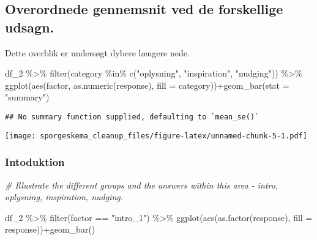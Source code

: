 \documentclass[
]{article}
\newenvironment{Shaded}{\begin{snugshade}}{\end{snugshade}}
\newcommand{\AttributeTok}[1]{\textcolor[rgb]{0.77,0.63,0.00}{#1}}
\newcommand{\CommentTok}[1]{\textcolor[rgb]{0.56,0.35,0.01}{\textit{#1}}}
\newcommand{\FunctionTok}[1]{\textcolor[rgb]{0.00,0.00,0.00}{#1}}
\newcommand{\NormalTok}[1]{#1}
\newcommand{\SpecialCharTok}[1]{\textcolor[rgb]{0.00,0.00,0.00}{#1}}
\newcommand{\StringTok}[1]{\textcolor[rgb]{0.31,0.60,0.02}{#1}}
\begin{document}
\hypertarget{overordnede-gennemsnit-ved-de-forskellige-udsagn.}{%
\subsection{Overordnede gennemsnit ved de forskellige
udsagn.}\label{overordnede-gennemsnit-ved-de-forskellige-udsagn.}}

Dette overblik er undersøgt dybere længere nede.

\begin{Shaded}
\begin{Highlighting}[]
\NormalTok{df\_2 }\SpecialCharTok{\%\textgreater{}\%} 
  \FunctionTok{filter}\NormalTok{(category }\SpecialCharTok{\%in\%} \FunctionTok{c}\NormalTok{(}\StringTok{"oplysning"}\NormalTok{, }\StringTok{"inspiration"}\NormalTok{, }\StringTok{"nudging"}\NormalTok{)) }\SpecialCharTok{\%\textgreater{}\%} 
  \FunctionTok{ggplot}\NormalTok{(}\FunctionTok{aes}\NormalTok{(factor, }\FunctionTok{as.numeric}\NormalTok{(response), }\AttributeTok{fill =}\NormalTok{ category))}\SpecialCharTok{+}\FunctionTok{geom\_bar}\NormalTok{(}\AttributeTok{stat =} \StringTok{"summary"}\NormalTok{)}
\end{Highlighting}
\end{Shaded}

\begin{verbatim}
## No summary function supplied, defaulting to `mean_se()`
\end{verbatim}

\texttt{[image: sporgeskema\_cleanup\_files/figure-latex/unnamed-chunk-5-1.pdf]}

\hypertarget{intoduktion}{%
\subsubsection{Intoduktion}\label{intoduktion}}

\begin{Shaded}
\begin{Highlighting}[]
\CommentTok{\# Illustrate the different groups and the answers within this area {-} intro, oplysning, inspiration, nudging.}

\NormalTok{df\_2 }\SpecialCharTok{\%\textgreater{}\%} 
  \FunctionTok{filter}\NormalTok{(factor }\SpecialCharTok{==} \StringTok{"intro\_1"}\NormalTok{) }\SpecialCharTok{\%\textgreater{}\%} 
  \FunctionTok{ggplot}\NormalTok{(}\FunctionTok{aes}\NormalTok{(}\FunctionTok{as.factor}\NormalTok{(response), }\AttributeTok{fill =}\NormalTok{ response))}\SpecialCharTok{+}\FunctionTok{geom\_bar}\NormalTok{()}
\end{Highlighting}
\end{Shaded}
\end{document}
